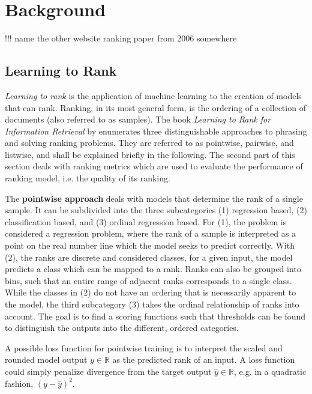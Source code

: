 \section{Background}
\label{sec:background}

!!! name the other website ranking paper from 2006 somewhere

\subsection{Learning to Rank}
\label{sec:learningtorank}

\textit{Learning to rank} is the application of machine learning to the creation of models that can rank. Ranking, in its most general form, is the ordering of a collection of documents (also referred to as samples). The book \textit{Learning to Rank for Information Retrieval} by \cite{liu2009learningtorank} enumerates three distinguishable approaches to phrasing and solving ranking problems. They are referred to as pointwise, pairwise, and listwise, and shall be explained briefly in the following. The second part of this section deals with ranking metrics which are used to evaluate the performance of ranking model, i.e. the quality of its ranking.

The \textbf{pointwise approach} deals with models that determine the rank of a single sample. It can be subdivided into the three subcategories (1) regression based, (2) classification based, and (3) ordinal regression based. For (1), the problem is considered a regression problem, where the rank of a sample is interpreted as a point on the real number line which the model seeks to predict correctly. With (2), the ranks are discrete and considered classes, for a given input, the model predicts a class which can be mapped to a rank. Ranks can also be grouped into bins, such that an entire range of adjacent ranks corresponds to a single class. While the classes in (2) do not have an ordering that is necessarily apparent to the model, the third subcategory (3) takes the ordinal relationship of ranks into account. The goal is to find a scoring functions such that thresholds can be found to distinguish the outputs into the different, ordered categories.

A possible loss function for pointwise training is to interpret the scaled and rounded model output $y\in\mathbb{R}$ as the predicted rank of an input. A loss function could simply penalize divergence from the target output $\hat{y}\in\mathbb{R}$, e.g. in a quadratic fashion, $(y-\hat{y})^2$.

